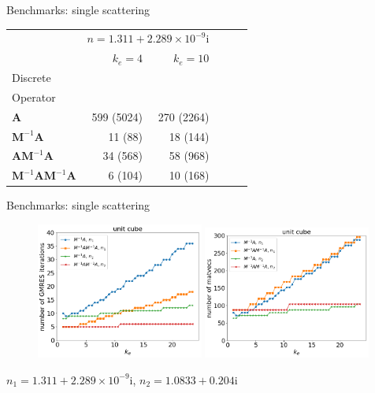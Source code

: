 \documentclass[12pt]{beamer}
\begin{document}
\begin{frame}{Benchmarks: single scattering}
\begin{footnotesize}
\begin{table}
\centering
\begin{tabular}{lrrrrr}
\toprule
& \multicolumn{2}{c}{$n=1.311 + 2.289 \times 10^{-9}\mathrm{i}$}  \\
\cmidrule{2-3}  
& $k_e=4$   & $k_e=10$       \\
\midrule
Discrete  &   &   \\
Operator & & \\
$\mathbf{A}$ & 599 (5024)  &  270 (2264) \\[4pt]
$\mathbf{M}^{-1} \mathbf{A}$ & 11 (88)  & 18 (144) \\[4pt]
$\mathbf{A}\mathbf{M}^{-1}\mathbf{A}$ &34 (568)    & 58 (968) \\[4pt]
$\mathbf{M}^{-1}\mathbf{A}\mathbf{M}^{-1}\mathbf{A}$ &6 (104)  &   10 (168) \\
\bottomrule
\end{tabular}
\end{table}
\end{footnotesize}
\end{frame}

\begin{frame}{Benchmarks: single scattering}
    \begin{figure}
    \includegraphics[width = 0.49\textwidth]{Figures/iterations.png}
    \includegraphics[width = 0.49\textwidth]{Figures/matvecs.png}
\end{figure}
$n_1=1.311 + 2.289 \times 10^{-9}\mathrm{i}$, \quad $n_2=1.0833 + 0.204 \mathrm{i}$
\end{frame}
\end{document}
